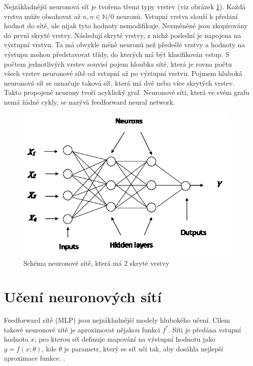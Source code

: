 Nejzákladnější neuronová síť je tvořena třemi typy vrstev (viz obrázek \ref{fig:mlp}). Každá vrstva může obsahovat až $n, n \in \mathbb{N}/{0}$ neuronů. Vstupní vrstva slouží k předání hodnot do sítě, ale nijak tyto hodnoty nemodifikuje. Nezměněné jsou zkopírovány do první skryté vrstvy. Následují skryté vrstvy, z nichž poslední je napojena na výstupní vrstvu. Ta má obvykle méně neuronů než předešlé vrstvy a hodnoty na výstupu mohou představovat třídy, do kterých má být klasifikován vstup. S počtem jednotlivých vrstev souvisí pojem hloubka sítě, která je rovna počtu všech vrstev neuronové sítě od vstupní až po výstupní vrstvu. Pojmem hluboká neuronová síť se označuje taková síť, která má dvě nebo více skrytých vrstev. Takto propojené neurony tvoří acyklický graf. Neuronové síti, která ve svém grafu nemá žádné cykly, se nazývá feedforward neural network.

\begin{figure}[H]
    \centering
    \includegraphics[scale=1.3]{obrazky-figures/mlp.png}
    \caption{\label{fig:mlp}Schéma neuronové sítě, která má 2 skryté vrstvy}
\end{figure}




\section{Učení neuronových sítí}

Feedforward sítě (MLP) jsou nejzákladnější modely hlubokého učení. Cílem takové neuronové sítě je aproximovat nějakou funkci $f^\ast$. Síti je předána vstupní hodnota $x$, pro kterou síť definuje mapování na výstupní hodnotu jako $y = f(x; \theta)$, kde $\theta$ je parametr, který se síť učí tak, aby dosáhla nejlepší aproximace funkce. \cite[p.~163]{mitdeeplearning}.





